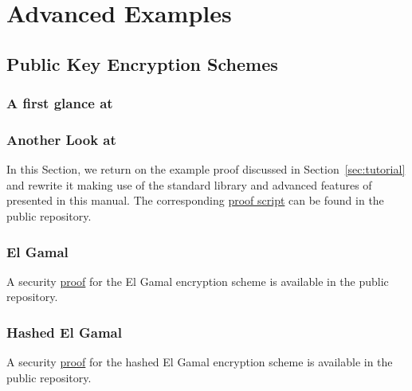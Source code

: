 
\chapter{Advanced Examples}

\section{Public Key Encryption Schemes}
\subsection{A first glance at \citet{Bellare:1993}\label{sec:tutorial}}


\subsection{Another Look at \citet{Bellare:1993}}
In this Section, we return on the example proof discussed in
Section~\ref{sec:tutorial} and rewrite it making use of the standard library and
advanced features of \EasyCrypt presented in this manual. The corresponding
\EasyCrypt \href{file:../examples/br93.ec}{proof script} can be found in the
public repository.

\subsection{El Gamal}
A security \href{file:../examples/elgamal.ec}{proof} for the El Gamal encryption scheme is available in the public
repository.

\subsection{Hashed El Gamal}
A security \href{file:../examples/hashed_elgamal.ec}{proof} for the hashed El Gamal encryption scheme is available in the
public repository.



